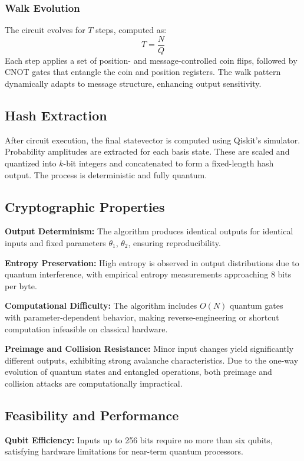 \documentclass[conference]{IEEEtran}
\begin{document}
\subsubsection{Walk Evolution}
The circuit evolves for $T$ steps, computed as:
\[
T = \frac{N}{Q}
\]
 Each step applies a set of position- and message-controlled coin flips, followed by CNOT gates that entangle the coin and position registers. The walk pattern dynamically adapts to message structure, enhancing output sensitivity.

\subsection{Hash Extraction}

After circuit execution, the final statevector is computed using Qiskit's simulator. Probability amplitudes are extracted for each basis state. These are scaled and quantized into $k$-bit integers and concatenated to form a fixed-length hash output. The process is deterministic and fully quantum.

\subsection{Cryptographic Properties}

\textbf{Output Determinism:} The algorithm produces identical outputs for identical inputs and fixed parameters $\theta_1$, $\theta_2$, ensuring reproducibility.

\textbf{Entropy Preservation:} High entropy is observed in output distributions due to quantum interference, with empirical entropy measurements approaching 8 bits per byte.

\textbf{Computational Difficulty:} The algorithm includes $O(N)$ quantum gates with parameter-dependent behavior, making reverse-engineering or shortcut computation infeasible on classical hardware.

\textbf{Preimage and Collision Resistance:} Minor input changes yield significantly different outputs, exhibiting strong avalanche characteristics. Due to the one-way evolution of quantum states and entangled operations, both preimage and collision attacks are computationally impractical.

\subsection{Feasibility and Performance}

\textbf{Qubit Efficiency:} Inputs up to 256 bits require no more than six qubits, satisfying hardware limitations for near-term quantum processors.
\end{document}
